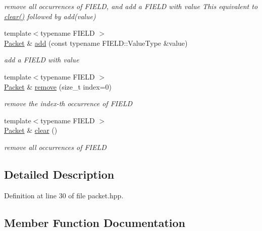 \begin{DoxyCompactItemize}
\begin{DoxyCompactList}\small\item\em remove all occurrences of F\+I\+E\+LD, and add a F\+I\+E\+LD with value  This equivalent to \hyperlink{classndn_1_1lp_1_1Packet_a63200389c94495760b2bcd9b7c1f3eb1}{clear()} followed by add(value) \end{DoxyCompactList}\item 
{\footnotesize template$<$typename F\+I\+E\+LD $>$ }\\\hyperlink{classndn_1_1lp_1_1Packet}{Packet} \& \hyperlink{classndn_1_1lp_1_1Packet_aa85b34535b767450640181e82f1cbb92}{add} (const typename F\+I\+E\+L\+D\+::\+Value\+Type \&value)
\begin{DoxyCompactList}\small\item\em add a F\+I\+E\+LD with value \end{DoxyCompactList}\item 
{\footnotesize template$<$typename F\+I\+E\+LD $>$ }\\\hyperlink{classndn_1_1lp_1_1Packet}{Packet} \& \hyperlink{classndn_1_1lp_1_1Packet_a5113587cee9ec70077086ef61abede4b}{remove} (size\+\_\+t index=0)
\begin{DoxyCompactList}\small\item\em remove the index-\/th occurrence of F\+I\+E\+LD \end{DoxyCompactList}\item 
{\footnotesize template$<$typename F\+I\+E\+LD $>$ }\\\hyperlink{classndn_1_1lp_1_1Packet}{Packet} \& \hyperlink{classndn_1_1lp_1_1Packet_a63200389c94495760b2bcd9b7c1f3eb1}{clear} ()\hypertarget{classndn_1_1lp_1_1Packet_a63200389c94495760b2bcd9b7c1f3eb1}{}\label{classndn_1_1lp_1_1Packet_a63200389c94495760b2bcd9b7c1f3eb1}

\begin{DoxyCompactList}\small\item\em remove all occurrences of F\+I\+E\+LD \end{DoxyCompactList}\end{DoxyCompactItemize}


\subsection{Detailed Description}


Definition at line 30 of file packet.\+hpp.



\subsection{Member Function Documentation}
